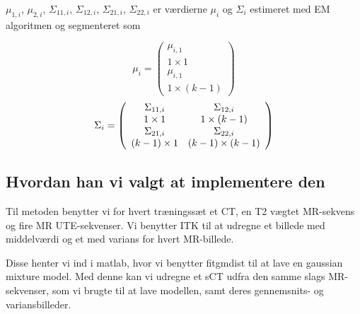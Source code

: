 $\mu_{1,i}$, $\mu_{2,i}$, $\Sigma_{1 1, i}$, $\Sigma_{1 2, i}$, $\Sigma_{2 1, i}$, $\Sigma_{2 2, i}$ er værdierne $\mu_i$ og $\Sigma_i$ estimeret med EM algoritmen og segmenteret som

\begin{equation}
\mu_i = \left(\begin{array}{c}
\mu_{i,1} \\ 1 \times 1 \\
\mu_{i,1} \\ 1 \times (k - 1)  
\end{array}\right)
\end{equation} 
\begin{equation}
\Sigma_i = \left(\begin{array}{c c}
\Sigma_{11,i} & \Sigma_{12,i} \\ 1 \times 1  & 1 \times (k-1)\\
\Sigma_{21,i} & \Sigma_{22,i} \\ (k-1) \times 1  & (k-1) \times (k-1)\\  
\end{array}\right)
\end{equation}

\subsection{Hvordan han vi valgt at implementere den}

Til metoden benytter vi for hvert træningssæt et CT, en T2 vægtet MR-sekvens
og fire MR UTE-sekvenser. Vi benytter ITK til at udregne et
billede med middelværdi og et med varians for hvert MR-billede.

Disse henter vi ind i matlab, hvor vi benytter fitgmdist til at lave en
gaussian mixture model. Med denne kan vi udregne et sCT udfra den
samme slags MR-sekvenser, som vi brugte til at lave modellen, samt deres
gennemsnits- og variansbilleder.

